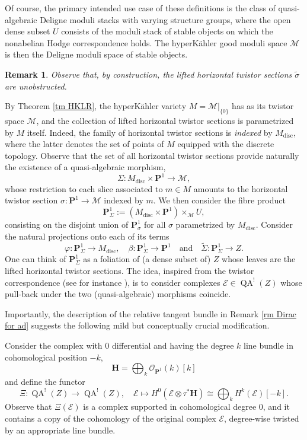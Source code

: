 \documentclass[11pt, a4paper]{amsart}
\numberwithin{equation}{section}
\newtheorem{remark}[theorem]{Remark}
\theoremstyle{definition}
\theoremstyle{remark}
\DeclareMathOperator{\QA}{QA}
\DeclareMathOperator{\discrete}{\mathrm{disc}}
\newcommand{\Ee}{\mathcal{E}}
\newcommand{\Mm}{\mathcal{M}}
\newcommand{\Oo}{\mathcal{O}}
\renewcommand{\H}{\mathbf{H}}
\renewcommand{\P}{\mathbf{P}}
\newcommand{\wt}[1]{\widetilde{#1}}
\renewcommand{\to}{\longrightarrow}
\begin{document}
Of course, the primary intended use case of these definitions is the class of quasi-algebraic Deligne moduli stacks with varying structure groups, where the open dense subset $U$ consists of the moduli stack of stable objects on which the nonabelian Hodge correspondence holds. The hyperK\"ahler good moduli space $\Mm$ is then the Deligne moduli space of stable objects. 

\begin{remark}
Observe that, by construction, the lifted horizontal twistor sections $\wt \sigma$ are unobstructed.
\end{remark}

By Theorem \ref{tm HKLR}, the hyperK\"ahler variety $M = \Mm|_{\{0 \} }$ has as its twistor space $\Mm$, and the collection of lifted horizontal twistor sections is parametrized by $M$ itself. Indeed, the family of horizontal twistor sections is {\it indexed} by $M_{\discrete}$, where the latter denotes the set of points of $M$ equipped with the discrete topology. Observe that the set of all horizontal twistor sections provide naturally the existence of a quasi-algebraic morphism,
\[
\Sigma : M_{\discrete} \times \P^1 \to \Mm, 
\]
whose restriction to each slice associated to $m \in M$ amounts to the horizontal twistor section $\sigma :  \P^1 \to \Mm$ indexed by $m$. We then consider the fibre product
\[
\P^1_{\Sigma} := \left ( M_{\discrete} \times \P^1 \right ) \times_{\Mm} U,
\]
consisting on the disjoint union of $\P^1_{\sigma}$ for all $\sigma$ parametrized by $M_{\discrete}$. Consider the natural projections onto each of its terms 
\[
\varphi : \P^1_{\Sigma} \to M_{\discrete}, \quad \beta : \P^1_{\Sigma} \to \P^1 \quad \text{and} \quad
\wt \Sigma : \P^1_{\Sigma} \to Z.
\]
One can think of $\P^1_{\Sigma}$ as a foliation of (a dense subset of) $Z$ whose leaves are the lifted horizontal twistor sections. The idea, inspired from the twistor correspondence (see for instance \cite{kaledin&verbitsky}), is to consider complexes $\Ee \in \QA^!(Z)$ whose pull-back under the two (quasi-algebraic) morphisms coincide. 

Importantly, the description of the relative tangent bundle in Remark \ref{rm Dirac for ad} suggests the following mild but conceptually crucial modification. 

Consider the complex with $0$ differential and having the degree $k$ line bundle in cohomological position $-k$,  
\[
\H = \bigoplus_k \Oo_{\P^1}(k)[k]  
\]
and define the functor
\[
\Xi : \QA^!(Z) \to \QA^!(Z), \quad \Ee \mapsto H^0(\Ee \otimes \tau^*\H) \cong \bigoplus_k H^k(\Ee)[-k].
\]
Observe that $\Xi(\Ee)$ is a complex supported in cohomological degree $0$, and it contains a copy of the cohomology of the original complex $\Ee$, degree-wise twisted by an appropriate line bundle.
\end{document}
